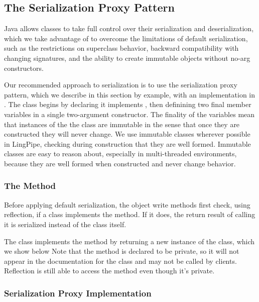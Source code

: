 \subsection{The Serialization Proxy Pattern}\label{section:io-serialization-proxy}

Java allows classes to take full control over their serialization and
deserialization, which we take advantage of to overcome the
limitations of default serialization, such as the restrictions on
superclass behavior, backward compatibility with changing signatures,
and the ability to create immutable objects without no-arg constructors.

Our recommended approach to serialization is to use the serialization
proxy pattern, which we describe in this section by example, with an
implementation in .  The class begins by declaring
it implements , then definining two final member
variables in a single two-argument constructor.  
%
%
The finality of the variables mean that instances of the the class are
immutable in the sense that once they are constructed they will never
change.  We use immutable classes wherever possible in LingPipe,
checking during construction that they are well formed.  Immutable
classes are easy to reason about, especially in multi-threaded
environments, because they are well formed when constructed and never
change behavior.

\subsubsection{The  Method}

Before applying default serialization, the object write methods first
check, using reflection, if a class implements the
 method.  If it does, the return result of
calling it is serialized instead of the class itself.  

The  class implements the 
method by returning a new instance of the  class,
which we show below
%
%
Note that the method is declared to be private, so it will not appear
in the documentation for the class and may not be called by clients.
Reflection is still able to access the method even though it's
private. 

\subsubsection{Serialization Proxy Implementation}

